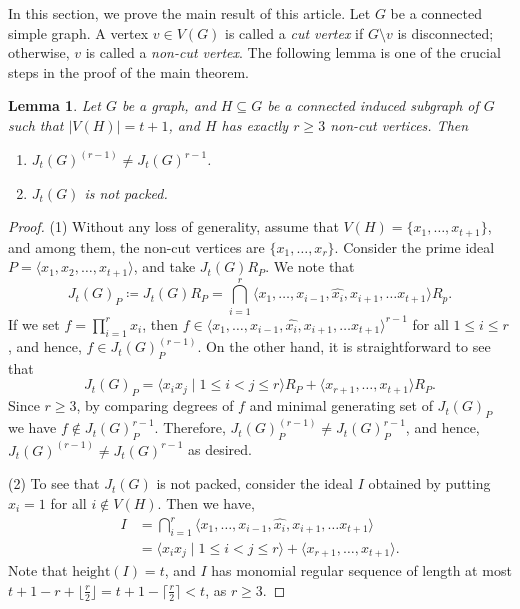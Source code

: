 \documentclass[12pt]{amsart}
\newtheorem{lemma}[proposition]{Lemma}
\def\l{\langle}
\def\r{\rangle}
\begin{document}
In this section, we prove the main result of this article. Let $G$ be a connected simple graph. A vertex $v\in V(G)$ is called a \emph{cut vertex} if $G\setminus v$ is disconnected; otherwise, $v$ is called a \emph{non-cut vertex}. The following lemma is one of the crucial steps in the proof of the main theorem. 
\begin{lemma}\label{lem: main}
    Let $G$ be a graph, and $H\subseteq G$ be a connected induced subgraph of $G$ such that $|V(H)|=t+1$, and $H$ has exactly $r\geq 3$ non-cut vertices. Then 
    \begin{enumerate}
        \item $J_t(G)^{(r-1)}\neq J_t(G)^{r-1}$.
        \item $J_t(G)$ is not packed.
    \end{enumerate}
\end{lemma}
\begin{proof}
    (1) Without any loss of generality, assume that $V(H)=\{x_1,\dots , x_{t+1}\}$, and among them, the non-cut vertices are $\{x_1,\dots , x_r\}$. Consider the prime ideal $P=\l x_1,x_2,\dots , x_{t+1}\r$, and take $J_t(G)R_P$. We note that 
    \[
    J_t(G)_P\coloneq J_t(G)R_P=\bigcap_{i=1}^{r} \l x_1,\dots ,x_{i-1}, \widehat{x_i}, x_{i+1},\dots x_{t+1} \r R_p.
    \]
    If we set $f=\prod_{i=1}^{r}x_i$, then $f\in \l x_1,\dots ,x_{i-1}, \hat{x_i}, x_{i+1},\dots x_{t+1} \r^{r-1}$ for all $1\leq i\leq r$, and hence, $f\in J_t(G)_P^{(r-1)}$. On the other hand, it is straightforward to see that 
    \[
    J_t(G)_P=\l x_ix_j\mid 1\leq i<j\leq r\r R_P +\l x_{r+1},\dots , x_{t+1}\r R_P.
    \]
    Since $r\geq 3$, by comparing degrees of $f$ and minimal generating set of $J_t(G)_P$ we have $f\notin J_t(G)_P^{r-1}$. Therefore, $J_t(G)_P^{(r-1)}\neq J_t(G)_P^{r-1}$, and hence, $J_t(G)^{(r-1)}\neq J_t(G)^{r-1}$ as desired.

    \medskip
    \noindent
    (2) To see that $J_t(G)$ is not packed, consider the ideal $I$ obtained by putting $x_i=1$ for all $i \notin V(H)$. Then we have, 
    \begin{align*}
        I&=\bigcap_{i=1}^{r} \l x_1,\dots ,x_{i-1}, \widehat{x_i}, x_{i+1},\dots x_{t+1} \r\\
        &= \l x_ix_j\mid 1\leq i<j\leq r\r +\l x_{r+1},\dots , x_{t+1}\r.
    \end{align*}
    Note that $\mathrm{height}(I)=t$, and $I$ has monomial regular sequence of length at most $t+1-r+\lfloor \frac{r}{2} \rfloor=t+1-\lceil \frac{r}{2} \rceil <t$, as $r\geq 3$.
\end{proof}
\end{document}
